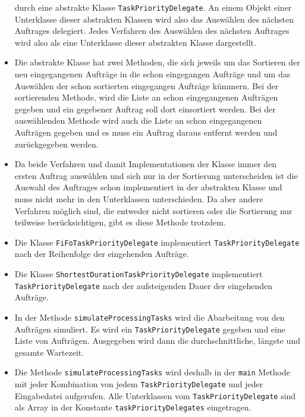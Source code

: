 \documentclass[a4paper,10pt,ngerman]{scrartcl}
\begin{document}
\begin{itemize}
	      durch eine abstrakte Klasse \texttt{TaskPriorityDelegate}.
	      An einem Objekt einer Unterklasse dieser abstrakten Klassen wird
	      also das Auswählen des nächsten Auftrages delegiert.
	      Jedes Verfahren des Auswählen des nächsten Auftrages wird
	      also als eine Unterklasse dieser abstrakten Klasse dargestellt.
	\item Die abstrakte Klasse hat zwei Methoden, die sich jeweils um das Sortieren
	      der neu eingegangenen Aufträge in die schon eingegangen Aufträge
	      und um das Auswählen der schon sortierten eingegangen Aufträge kümmern.
	      Bei der sortierenden Methode, wird die Liste an schon eingegangenen Aufträgen gegeben
	      und ein gegebener Auftrag soll dort einsortiert werden.
	      Bei der auswählenden Methode wird auch die Liste an schon eingegangenen Aufträgen gegeben
	      und es muss ein Auftrag daraus entfernt werden und zurückgegeben werden.
	\item Da beide Verfahren und damit Implementationen der Klasse immer den ersten Auftrag auswählen
	      und sich nur in der Sortierung unterscheiden ist die Auswahl des Auftrages schon implementiert in der abstrakten Klasse
	      und muss nicht mehr in den Unterklassen unterschieden. Da aber andere Verfahren möglich sind,
	      die entweder nicht sortieren oder die Sortierung nur teilweise berücksichtigen, gibt es diese Methode trotzdem.
	\item Die Klasse \texttt{FiFoTaskPriorityDelegate} implementiert \texttt{TaskPriorityDelegate}
	      nach der Reihenfolge der eingehenden Aufträge.
	\item Die Klasse \texttt{ShortestDurationTaskPriorityDelegate} implementiert \texttt{TaskPriorityDelegate}
	      nach der aufsteigenden Dauer der eingehenden Aufträge.
	\item In der Methode \texttt{simulateProcessingTasks} wird die Abarbeitung von den Aufträgen simuliert.
	      Es wird ein \texttt{TaskPriorityDelegate} gegeben und eine Liste von Aufträgen.
	      Ausgegeben wird dann die durchschnittliche, längste und gesamte Wartezeit.
	\item Die Methode \texttt{simulateProcessingTasks} wird deshalb in der \texttt{main} Methode
	      mit jeder Kombination von jedem \texttt{TaskPriorityDelegate} und jeder Eingabedatei aufgerufen.
	      Alle Unterklassen vom \texttt{TaskPriorityDelegate} sind als Array
	      in der Konstante \texttt{taskPriorityDelegates} eingetragen.
\end{itemize}
\end{document}
